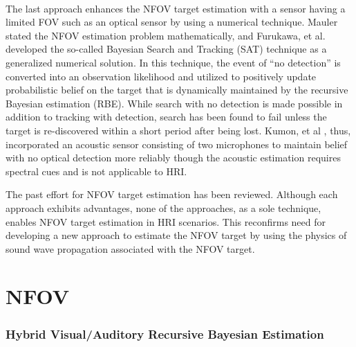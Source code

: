 \documentclass[letterpaper, 10 pt, conference]{ieeeconf}  %
\begin{document}
\\
The last approach enhances the NFOV target estimation with a sensor having a limited FOV such as an optical sensor by using a numerical technique.  Mauler \cite{mau03} stated the NFOV estimation problem mathematically, and Furukawa, et al. \cite{fur06,fur12} developed the so-called Bayesian Search and Tracking (SAT) technique as a generalized numerical solution.  In this technique, the event of ``no detection'' is converted into an observation likelihood and utilized to positively update probabilistic belief on the target that is dynamically maintained by the recursive Bayesian estimation (RBE).  While search with no detection is made possible in addition to tracking with detection, search has been found to fail unless the target is re-discovered within a short period after being lost.  Kumon, et al \cite{kum13}, thus, incorporated an acoustic sensor consisting of two microphones to maintain belief with no optical detection more reliably though the acoustic estimation requires spectral cues and is not applicable to HRI.   

The past effort for NFOV target estimation has been reviewed.  Although each approach exhibits advantages, none of the approaches, as a sole technique, enables NFOV target estimation in HRI scenarios.  This reconfirms need for developing a new approach to estimate the NFOV target by using the physics of sound wave propagation associated with the NFOV target.  

\section{NFOV }
	\subsubsection{Hybrid Visual/Auditory Recursive Bayesian Estimation}
\end{document}
